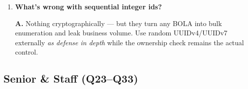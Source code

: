 \begin{enumerate}[label=\textbf{Q\arabic*.}, leftmargin=1.7cm, itemsep=0.9em, start=11]
        double-submit header for state-changing methods; custom-header
        requirement as depth. Bearer tokens in \texttt{Authorization}
        headers are CSRF-immune by construction.
  \item \textbf{What's wrong with sequential integer ids?}\par
        \textbf{A.} Nothing cryptographically --- but they turn any BOLA
        into bulk enumeration and leak business volume. Use random
        UUIDv4/UUIDv7 externally \emph{as defense in depth} while the
        ownership check remains the actual control.
\end{enumerate}

\subsection*{Senior \& Staff (Q23--Q33)}

